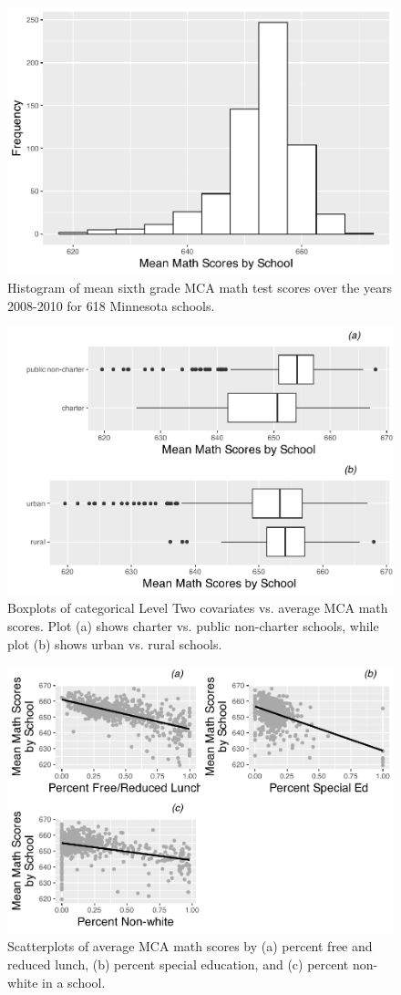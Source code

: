 \documentclass[
]{krantz}
\begin{document}
\begin{figure}

{\centering \includegraphics[width=0.6\linewidth]{bookdown-BeyondMLR_files/figure-latex/lon-hist1-1} 

}

\caption{Histogram of mean sixth grade MCA math test scores over the years 2008-2010 for 618 Minnesota schools.}\label{fig:lon-hist1}
\end{figure}

\begin{figure}

{\centering \includegraphics[width=0.6\linewidth]{bookdown-BeyondMLR_files/figure-latex/lon-box1-1} 

}

\caption{Boxplots of categorical Level Two covariates vs. average MCA math scores.  Plot (a) shows charter vs. public non-charter schools, while plot (b) shows urban vs. rural schools.}\label{fig:lon-box1}
\end{figure}

\begin{figure}

{\centering \includegraphics[width=0.6\linewidth]{bookdown-BeyondMLR_files/figure-latex/lon-scat1-1} 

}

\caption{ Scatterplots of average MCA math scores by (a) percent free and reduced lunch, (b) percent special education, and (c) percent non-white in a school.}\label{fig:lon-scat1}
\end{figure}
\end{document}
